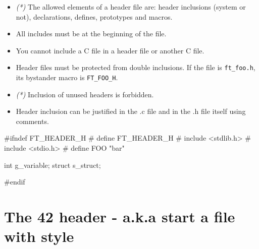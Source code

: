 \documentclass{42-en}
\begin{document}
        \begin{itemize}

            \item \textit{(*)} The allowed elements of a header file are:
                header inclusions (system or not), declarations, defines,
                prototypes and macros.

            \item All includes must be at the beginning of the file.

            \item You cannot include a C file in a header file or another C file.

            \item Header files must be protected from double inclusions. If the file is
            \texttt{ft\_foo.h}, its bystander macro is \texttt{FT\_FOO\_H}.

            \item \textit{(*)} Inclusion of unused headers is forbidden.

            \item Header inclusion can be justified in the .c file and in the .h file itself
              using comments.

        \end{itemize}

\vspace{1cm}
        
        \begin{42ccode}
#ifndef FT_HEADER_H
# define FT_HEADER_H
# include <stdlib.h>
# include <stdio.h>
# define FOO "bar"

int     g_variable;
struct  s_struct;

#endif
        \end{42ccode}
        \newpage



   \section{The 42 header - a.k.a start a file with style}
\end{document}
